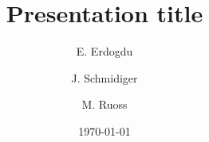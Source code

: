 \documentclass{beamer}
\title{Presentation title}
\author[E. Erdogdu, J. Schmidiger, M. Ruoss] %
{E. Erdogdu\inst{1} \and J. Schmidiger\inst{2} \and M. Ruoss\inst{3}}
\institute[UZH] %
{
  \inst{1}%
  Faculty of Banking and Finance\\
  Very Famous University
  \and
  \inst{2}%
  Faculty of Banking and Finance\\
  Very Famous University
  \and
  \inst{3}%
  Faculty of Banking and Finance\\
  Very Famous University
}
\date{\today}
\begin{document}
\frame{\titlepage}




\end{document}
